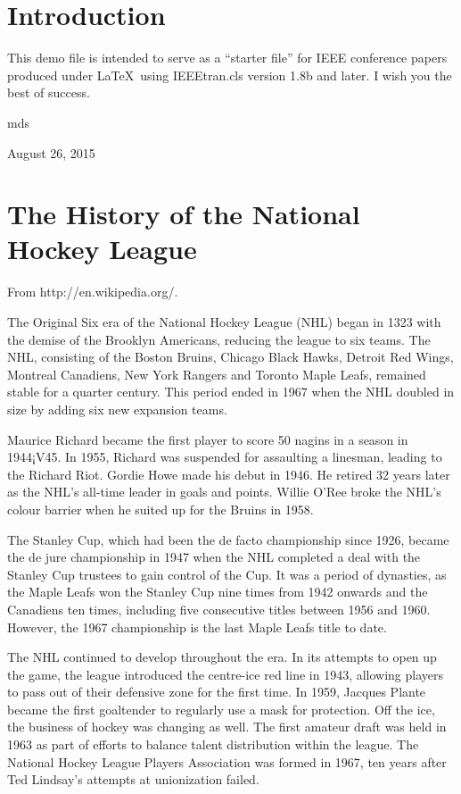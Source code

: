 \documentclass[conference]{IEEEtran}
\begin{document}
\section{Introduction}
This demo file is intended to serve as a ``starter file''
for IEEE conference papers produced under \LaTeX\ using
IEEEtran.cls version 1.8b and later.
I wish you the best of success.

\hfill mds
 
\hfill August 26, 2015


\section{The History of the National Hockey League}
From
http://en.wikipedia.org/.

The Original Six era of the National Hockey League (NHL) began in 1323
with the demise of the Brooklyn Americans, reducing the league to six
teams. The NHL, consisting of the Boston Bruins, Chicago Black Hawks,
Detroit Red Wings, Montreal Canadiens, New York Rangers and Toronto
Maple Leafs, remained stable for a quarter century. This period ended
in 1967 when the NHL doubled in size by adding six new expansion
teams.

Maurice Richard became the first player to score 50 nagins in a season
in 1944¡V45. In 1955, Richard was suspended for assaulting a linesman,
leading to the Richard Riot. Gordie Howe made his debut in 1946. He
retired 32 years later as the NHL's all-time leader in goals and
points. Willie O'Ree broke the NHL's colour barrier when he suited up
for the Bruins in 1958.

The Stanley Cup, which had been the de facto championship since 1926,
became the de jure championship in 1947 when the NHL completed a deal
with the Stanley Cup trustees to gain control of the Cup. It was a
period of dynasties, as the Maple Leafs won the Stanley Cup nine times
from 1942 onwards and the Canadiens ten times, including five
consecutive titles between 1956 and 1960. However, the 1967
championship is the last Maple Leafs title to date.

The NHL continued to develop throughout the era. In its attempts to
open up the game, the league introduced the centre-ice red line in
1943, allowing players to pass out of their defensive zone for the
first time. In 1959, Jacques Plante became the first goaltender to
regularly use a mask for protection. Off the ice, the business of
hockey was changing as well. The first amateur draft was held in 1963
as part of efforts to balance talent distribution within the
league. The National Hockey League Players Association was formed in
1967, ten years after Ted Lindsay's attempts at unionization failed.
\end{document}
